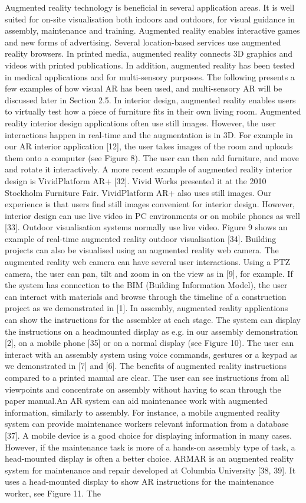 Augmented reality technology is beneficial in several application areas. It is well suited for on-site visualisation both indoors and outdoors, for visual guidance in assembly, maintenance and training. Augmented reality enables interactive games and new forms of advertising. Several location-based services use augmented reality browsers. In printed media, augmented reality connects 3D graphics and videos with printed publications. In addition, augmented reality has been tested in medical applications and for multi-sensory purposes. The following presents a few examples of how visual AR has been used, and multi-sensory AR will be discussed later in Section 2.5. In interior design, augmented reality enables users to virtually test how a piece of furniture fits in their own living room. Augmented reality interior design applications often use still images. However, the user interactions happen in real-time and the augmentation is in 3D. For example in our AR interior application [12], the user takes images of the room and uploads them onto a computer (see Figure 8). The user can then add furniture, and move and rotate it interactively. A more recent example of augmented reality interior design is VividPlatform AR+ [32]. Vivid Works presented it at the 2010 Stockholm Furniture Fair. VividPlatform AR+ also uses still images. Our experience is that users find still images convenient for interior design. However, interior design can use live video in PC environments or on mobile phones as well [33]. Outdoor visualisation systems normally use live video. Figure 9 shows an example of real-time augmented reality outdoor visualisation [34]. Building projects can also be visualised using an augmented reality web camera. The augmented reality web camera can have several user interactions. Using a PTZ camera, the user can pan, tilt and zoom in on the view as in [9], for example. If the system has connection to the BIM (Building Information Model), the user can interact with materials and browse through the timeline of a construction project as we demonstrated in [1]. In assembly, augmented reality applications can show the instructions for the assembler at each stage. The system can display the instructions on a headmounted display as e.g. in our assembly demonstration [2], on a mobile phone [35] or on a normal display (see Figure 10). The user can interact with an assembly system using voice commands, gestures or a keypad as we demonstrated in [7] and [6]. The benefits of augmented reality instructions compared to a printed manual are clear. The user can see instructions from all viewpoints and concentrate on assembly without having to scan through the paper manual.An AR system can aid maintenance work with augmented information, similarly to assembly. For instance, a mobile augmented reality system can provide maintenance workers relevant information from a database [37]. A mobile device is a good choice for displaying information in many cases. However, if the maintenance task is more of a hands-on assembly type of task, a head-mounted display is often a better choice. ARMAR is an augmented reality system for maintenance and repair developed at Columbia University [38, 39]. It uses a head-mounted display to show AR instructions for the maintenance worker, see Figure 11. The 